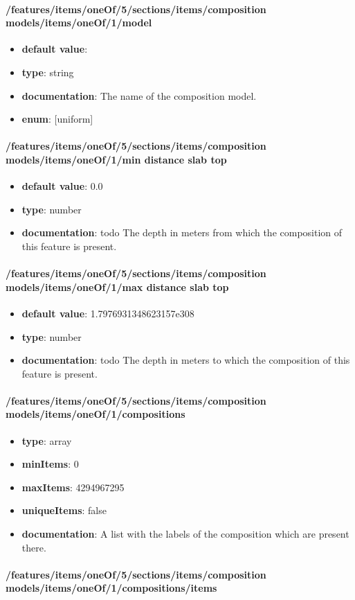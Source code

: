 \paragraph{/features/items/oneOf/5/sections/items/composition models/items/oneOf/1/model}
\begin{itemize}\item {\bf default value}: 
\item {\bf type}: string
\item {\bf documentation}: The name of the composition model.
\item {\bf enum}: [uniform]\end{itemize}\paragraph{/features/items/oneOf/5/sections/items/composition models/items/oneOf/1/min distance slab top}
\begin{itemize}\item {\bf default value}: 0.0
\item {\bf type}: number
\item {\bf documentation}: todo The depth in meters from which the composition of this feature is present.
\end{itemize}\paragraph{/features/items/oneOf/5/sections/items/composition models/items/oneOf/1/max distance slab top}
\begin{itemize}\item {\bf default value}: 1.7976931348623157e308
\item {\bf type}: number
\item {\bf documentation}: todo The depth in meters to which the composition of this feature is present.
\end{itemize}\paragraph{/features/items/oneOf/5/sections/items/composition models/items/oneOf/1/compositions}
\begin{itemize}\item {\bf type}: array
\item {\bf minItems}: 0
\item {\bf maxItems}: 4294967295
\item {\bf uniqueItems}: false
\item {\bf documentation}: A list with the labels of the composition which are present there.
\end{itemize}\paragraph{/features/items/oneOf/5/sections/items/composition models/items/oneOf/1/compositions/items}
